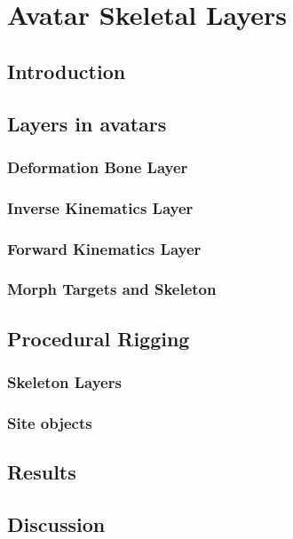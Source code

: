 \chapter{Avatar Skeletal Layers}

\section{Introduction}

\section{Layers in avatars}

\subsection{Deformation Bone Layer}

\subsection{Inverse Kinematics Layer}

\subsection{Forward Kinematics Layer}

\subsection{Morph Targets and Skeleton}

\section{Procedural Rigging}

\subsection{Skeleton Layers}

\subsection{Site objects}

\section{Results}

\section{Discussion}